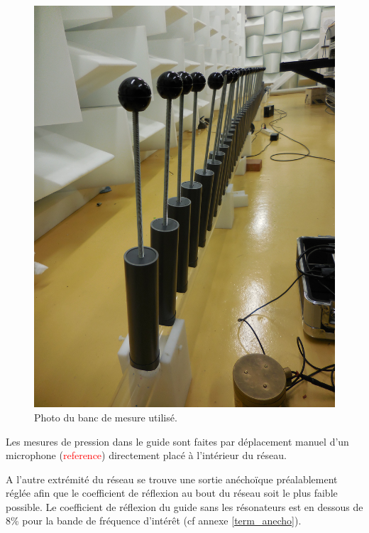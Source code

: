 \begin{figure}
	\centering
	\includegraphics[scale=0.05]{images_chp3/DSCN0123.JPG}
	\caption{Photo du banc de mesure utilisé.}
\end{figure}

Les mesures de pression dans le guide sont faites par déplacement manuel d'un microphone (\textcolor{red}{reference}) directement placé à l'intérieur du réseau.




\bigskip

A l'autre extrémité du réseau se trouve une sortie anéchoïque préalablement réglée afin que le coefficient de réflexion au bout du réseau soit le plus faible possible. Le coefficient de réflexion du guide sans les résonateurs est en dessous de 8\% pour la bande de fréquence d'intérêt (cf annexe \ref{term_anecho}).



